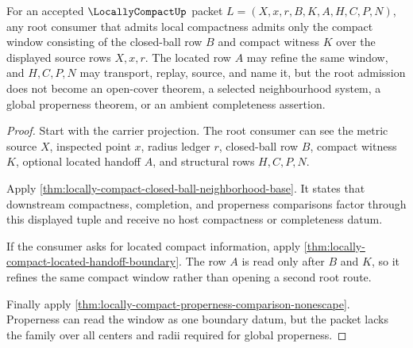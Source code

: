 \begin{theorem}
\label{thm:locallycompact-compact-window-root-admission}
For an accepted $\LocallyCompactUp$ packet $L=(X,x,r,B,K,A,H,C,P,N)$, any root consumer that admits local compactness admits only the compact window consisting of the closed-ball row $B$ and compact witness $K$ over the displayed source rows $X,x,r$. The located row $A$ may refine the same window, and $H,C,P,N$ may transport, replay, source, and name it, but the root admission does not become an open-cover theorem, a selected neighbourhood system, a global properness theorem, or an ambient completeness assertion.
\end{theorem}
\begin{proof}
Start with the carrier projection. The root consumer can see the metric source $X$, inspected point $x$, radius ledger $r$, closed-ball row $B$, compact witness $K$, optional located handoff $A$, and structural rows $H,C,P,N$.

Apply \autoref{thm:locally-compact-closed-ball-neighborhood-base}. It states that downstream compactness, completion, and properness comparisons factor through this displayed tuple and receive no host compactness or completeness datum.

If the consumer asks for located compact information, apply \autoref{thm:locally-compact-located-handoff-boundary}. The row $A$ is read only after $B$ and $K$, so it refines the same compact window rather than opening a second root route.

Finally apply \autoref{thm:locally-compact-properness-comparison-nonescape}. Properness can read the window as one boundary datum, but the packet lacks the family over all centers and radii required for global properness.
\end{proof}

